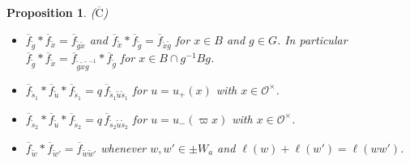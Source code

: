 \documentclass[12pt,letterpaper]{amsart}
\numberwithin{equation}{section}
\newtheorem{proposition}[theorem]{Proposition}
\theoremstyle{definition}
\theoremstyle{remark}
\newcommand{\cO}{\mathcal{O}}
\newcommand{\fbar}{\overline{f}}
\begin{document}
\begin{proposition}
\noindent
\textup{($\overline{\mbox{C}}$)}
\begin{itemize}[leftmargin=3em]
\item[(i)] $\fbar_{\tilde g}*\fbar_{\tilde x}=\fbar_{\tilde g\tilde x}$
and $\fbar_{\tilde x}*\fbar_{\tilde g}=\fbar_{\tilde x\tilde g}$ for
$x\in B$ and $g\in G$. In particular
$\fbar_{\tilde g}*\fbar_{\tilde x}
=\fbar_{\tilde g\tilde x\tilde g^{-1}}*\fbar_{\tilde g}$ for
$x\in B\cap g^{-1}Bg$.
\item[(ii)] $\fbar_{\tilde s_1}*\fbar_{\tilde u}*\fbar_{\tilde s_1}
=q\,\fbar_{\tilde s_1\tilde u\tilde s_1}$ for $u=u_+(x)$ with
$x\in\cO^\times$.
\item[(iii)] $\fbar_{\tilde s_2}*\fbar_{\tilde u}*\fbar_{\tilde s_2}
=q\,\fbar_{\tilde s_2\tilde u\tilde s_2}$ for $u=u_-(\varpi x)$ with
$x\in\cO^\times$.
\item[(iv)] $\fbar_{\tilde w}*\fbar_{\tilde w'}
=\fbar_{\tilde w\tilde w'}$ whenever $w,w'\in \pm W_a$ and
$\ell(w)+\ell(w')=\ell(ww')$.
\end{itemize}
\end{proposition}
\end{document}
